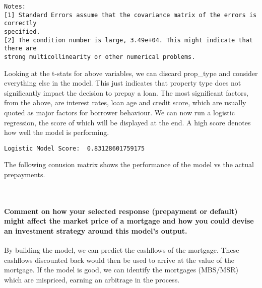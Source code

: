\documentclass[11pt]{article}
\begin{document}
\begin{Verbatim}[commandchars=\\\{\}]
Notes:
[1] Standard Errors assume that the covariance matrix of the errors is correctly
specified.
[2] The condition number is large, 3.49e+04. This might indicate that there are
strong multicollinearity or other numerical problems.
    \end{Verbatim}

    Looking at the t-stats for above variables, we can discard prop\_type
and consider everything else in the model. This just indicates that
property type does not significantly impact the decision to prepay a
loan. The most significant factors, from the above, are interest rates,
loan age and credit score, which are usually quoted as major factors for
borrower behaviour. We can now run a logistic regression, the score of
which will be displayed at the end. A high score denotes how well the
model is performing.

    \begin{Verbatim}[commandchars=\\\{\}]
Logistic Model Score:  0.83128601759175
    \end{Verbatim}

    The following conusion matrix shows the performance of the model vs the
actual prepayments.

    \begin{center}
    \end{center}
    { \hspace*{\fill} \\}
    
    \hypertarget{comment-on-how-your-selected-response-prepayment-or-default-might-affect-the-market-price-of-a-mortgage-and-how-you-could-devise-an-investment-strategy-around-this-models-output.}{%
\paragraph{Comment on how your selected response (prepayment or default)
might affect the market price of a mortgage and how you could devise an
investment strategy around this model's
output.}\label{comment-on-how-your-selected-response-prepayment-or-default-might-affect-the-market-price-of-a-mortgage-and-how-you-could-devise-an-investment-strategy-around-this-models-output.}}

    By building the model, we can predict the cashflows of the mortgage.
These cashflows discounted back would then be used to arrive at the
value of the mortgage. If the model is good, we can identify the
mortgages (MBS/MSR) which are mispriced, earning an arbitrage in the
process.
\end{document}
